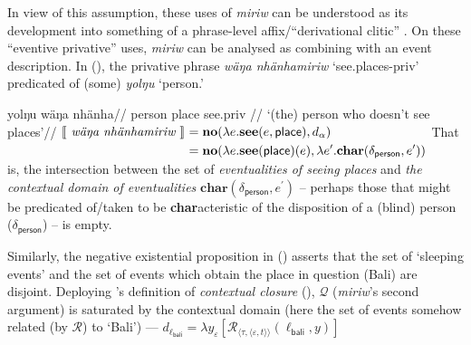 In view of this assumption, these uses of \textit{miriw} can be understood as its development into something of a phrase-level affix/``derivational clitic'' \citep{Anderson1992,Anderson2005}. On these ``eventive privative'' uses, \textit{miriw} can be analysed as combining with an event description. In (\nextx), the privative phrase \textit{wäŋa nhänhamiriw} `see.places-\gls{priv}' predicated of (some) \textit{yolŋu} `person.'


\pex 
\a\begingl\gla yolŋu wäŋa nhänha//
\glb person place see.\IV\textdblhyphen\gls{priv} //
\glft`(the) person who doesn't see places'//\endgl
\a$\begin{aligned}[t]\llbracket{\textit{
			wäŋa nhänhamiriw }}\rrbracket^{}&=\textbf{no}(\lambda e.\textbf{see}(e,\textsf{place}),d_\alpha)\\
	&=\textbf{no}(\lambda e.\textbf{see}(\textsf{place})(e),\lambda e^\prime.\textbf{char}(\delta_{\textsf{person}},e^\prime))\end{aligned}$
\a 	That is, the intersection between the set of \textit{eventualities of seeing places} and \textit{the contextual domain of eventualities} $\textbf{char}(\delta_{\textsf{person}},e^\prime)$ -- perhaps those that might be predicated of/taken to be \textbf{char}acteristic of the disposition of a (blind) person ($\delta_\textsf{person}$) -- is empty.
\xe

Similarly, the negative existential proposition in (\nextx) asserts that the set of `sleeping events' and the set of events which obtain the place in question (Bali) are disjoint. Deploying \citeauthor{Francez2007}'s definition of \textit{contextual closure} (), $ \mathcal Q $ (\textdblhyphen\textit{miriw}'s second argument) is saturated by the contextual domain (here the set of events somehow related (by $ \mathcal R $) to `Bali') --- $ d_{\ell_{\textsf{bali}}}=\lambda y_\varepsilon[\mathcal R_{\langle\tau,\langle\varepsilon,t\rangle\rangle}(\ell_{\textsf{bali}},y)]$


